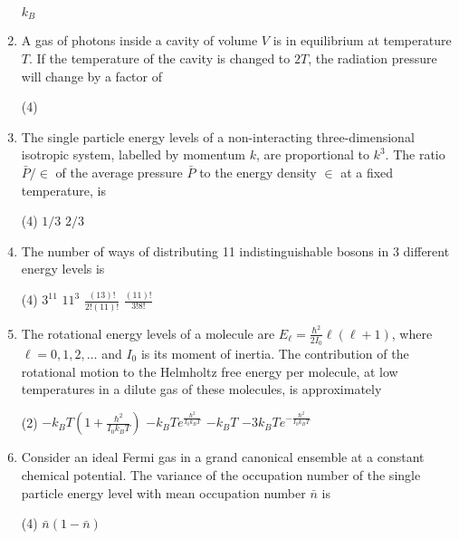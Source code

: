 \begin{enumerate}
\begin{tasks}
\task[\textbf{D.}] $k_{B}$
\end{tasks}
\item  A gas of photons inside a cavity of volume $V$ is in equilibrium at temperature $T$. If the temperature of the cavity is changed to $2 T$, the radiation pressure will change by a factor of
{}
\begin{tasks}(4)
\end{tasks}
\item The single particle energy levels of a non-interacting three-dimensional isotropic system, labelled by momentum $k$, are proportional to $k^{3}$. The ratio $\bar{P} / \in$ of the average pressure $\bar{P}$ to the energy density $\in$ at a fixed temperature, is
{}
\begin{tasks}(4)
\task[\textbf{A.}] $1 / 3$
\task[\textbf{B.}] $2 / 3$
\end{tasks}
\item The number of ways of distributing 11 indistinguishable bosons in 3 different energy levels is
{}
\begin{tasks}(4)
\task[\textbf{A.}]  $3^{11}$
\task[\textbf{B.}] $11^{3}$
\task[\textbf{C.}] $\frac{(13) !}{2 !(11) !}$
\task[\textbf{D.}]  $\frac{(11) !}{3 ! 8 !}$
\end{tasks}
\item The rotational energy levels of a molecule are $E_{\ell}=\frac{\hbar^{2}}{2 I_{0}} \ell(\ell+1)$, where $\ell=0,1,2, \ldots$ and $I_{0}$ is its moment of inertia. The contribution of the rotational motion to the Helmholtz free energy per molecule, at low temperatures in a dilute gas of these molecules, is approximately
{}
\begin{tasks}(2)
\task[\textbf{A.}]  $-k_{B} T\left(1+\frac{\hbar^{2}}{I_{0} k_{B} T}\right)$
\task[\textbf{B.}] $-k_{B} T e^{\frac{\hbar^{2}}{I_{0} k_{B} T}}$
\task[\textbf{C.}] $-k_{B} T$
\task[\textbf{D.}] $-3 k_{B} T e^{-\frac{\hbar^{2}}{I_{0} k_{B} T}}$
\end{tasks}  
 \item Consider an ideal Fermi gas in a grand canonical ensemble at a constant chemical potential. The variance of the occupation number of the single particle energy level with mean occupation number $\bar{n}$ is
{ }
\begin{tasks}(4)
\task[\textbf{A.}] $\bar{n}(1-\bar{n})$

\end{tasks}
\end{enumerate}

